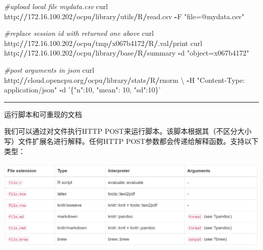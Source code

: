 \documentclass[]{book}
\newenvironment{Shaded}{\begin{snugshade}}{\end{snugshade}}
\newcommand{\FloatTok}[1]{\textcolor[rgb]{0.00,0.00,0.81}{#1}}
\newcommand{\StringTok}[1]{\textcolor[rgb]{0.31,0.60,0.02}{#1}}
\newcommand{\CommentTok}[1]{\textcolor[rgb]{0.56,0.35,0.01}{\textit{#1}}}
\newcommand{\OperatorTok}[1]{\textcolor[rgb]{0.81,0.36,0.00}{\textbf{#1}}}
\newcommand{\ErrorTok}[1]{\textcolor[rgb]{0.64,0.00,0.00}{\textbf{#1}}}
\newcommand{\NormalTok}[1]{#1}
\begin{document}
\begin{Shaded}
\begin{Highlighting}[]
\CommentTok{#upload local file mydata.csv}
\NormalTok{curl http}\OperatorTok{:}\ErrorTok{//}\FloatTok{172.16}\NormalTok{.}\FloatTok{100.202}\OperatorTok{/}\NormalTok{ocpu}\OperatorTok{/}\NormalTok{library}\OperatorTok{/}\NormalTok{utils}\OperatorTok{/}\NormalTok{R}\OperatorTok{/}\NormalTok{read.csv }\OperatorTok{-}\NormalTok{F }\StringTok{"file=@mydata.csv"}

\CommentTok{#replace session id with returned one above}
\NormalTok{curl http}\OperatorTok{:}\ErrorTok{//}\FloatTok{172.16}\NormalTok{.}\FloatTok{100.202}\OperatorTok{/}\NormalTok{ocpu}\OperatorTok{/}\NormalTok{tmp}\OperatorTok{/}\NormalTok{x067b4172}\OperatorTok{/}\NormalTok{R}\OperatorTok{/}\NormalTok{.val}\OperatorTok{/}\NormalTok{print}
\NormalTok{curl http}\OperatorTok{:}\ErrorTok{//}\FloatTok{172.16}\NormalTok{.}\FloatTok{100.202}\OperatorTok{/}\NormalTok{ocpu}\OperatorTok{/}\NormalTok{library}\OperatorTok{/}\NormalTok{base}\OperatorTok{/}\NormalTok{R}\OperatorTok{/}\NormalTok{summary }\OperatorTok{-}\NormalTok{d }\StringTok{"object=x067b4172"}
\end{Highlighting}
\end{Shaded}

\begin{Shaded}
\begin{Highlighting}[]
\CommentTok{#post arguments in json}
\NormalTok{curl http}\OperatorTok{:}\ErrorTok{//}\NormalTok{cloud.opencpu.org}\OperatorTok{/}\NormalTok{ocpu}\OperatorTok{/}\NormalTok{library}\OperatorTok{/}\NormalTok{stats}\OperatorTok{/}\NormalTok{R}\OperatorTok{/}\NormalTok{rnorm \textbackslash{}}
\OperatorTok{-}\NormalTok{H }\StringTok{"Content-Type: application/json"} \OperatorTok{-}\NormalTok{d }\StringTok{'\{"n":10, "mean": 10, "sd":10\}'}
\end{Highlighting}
\end{Shaded}

\begin{center}\rule{0.5\linewidth}{\linethickness}\end{center}

运行脚本和可重现的文档

我们可以通过对文件执行HTTP
POST来运行脚本。该脚本根据其（不区分大小写）文件扩展名进行解释。任何HTTP
POST参数都会传递给解释函数。支持以下类型：

\includegraphics{pic/opencpu/p10.png}
\end{document}
